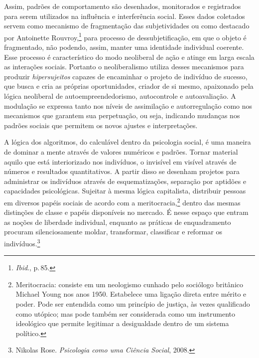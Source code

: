 Assim, padrões de comportamento são desenhados, monitorados e
registrados para serem utilizados na influência e interferência social.
Esses dados coletados servem como mecanismo de fragmentação das
subjetividades ou como destacado por Antoinette Rouvroy,\footnote{\textit{Ibid}., p.\,85.} para processo de dessubjetificação, em que o objeto é
fragmentado, não podendo, assim, manter uma identidade individual
coerente. Esse processo é característico do modo neoliberal de ação e
atinge em larga escala as interações sociais. Portanto o neoliberalismo
utiliza desses mecanismos para produzir \textit{hipersujeitos} capazes de
encaminhar o projeto de indivíduo de sucesso, que busca e cria as
próprias oportunidades, criador de si mesmo, apaixonado pela lógica
neoliberal de autoempreendedorismo, autocontrole e autoavaliação. A
modulação se expressa tanto nos níveis de assimilação e autorregulação
como nos mecanismos que garantem sua perpetuação, ou seja, indicando
mudanças nos padrões sociais que permitem os novos ajustes e
interpretações.

A lógica dos algoritmos, do calculável dentro da psicologia social, é
uma maneira de dominar a mente através de valores numéricos e padrões.
Tornar material aquilo que está interiorizado nos indivíduos, o
invisível em visível através de números e resultados quantitativos. A
partir disso se desenham projetos para administrar os indivíduos através
de esquematizações, separação por aptidões e capacidades psicológicas.
Sujeitar à mesma lógica capitalista, distribuir pessoas em diversos
papéis sociais de acordo com a meritocracia,\footnote{Meritocracia:
  consiste em um neologismo cunhado pelo sociólogo britânico Michael
  Young nos anos 1950. Estabelece uma ligação direta entre mérito e
  poder. Pode ser entendida como um princípio de justiça, às vezes
  qualificado como utópico; mas pode também ser considerada como um
  instrumento ideológico que permite legitimar a desigualdade dentro de
  um sistema político.} dentro das mesmas distinções de classe e papéis
disponíveis no mercado. É nesse espaço que entram as noções de liberdade
individual, enquanto as práticas de enquadramento procuram
silenciosamente moldar, transformar, classificar e reformar os
indivíduos.\footnote{Nikolas Rose. \textit{Psicologia como uma Ciência Social}, 2008.}

